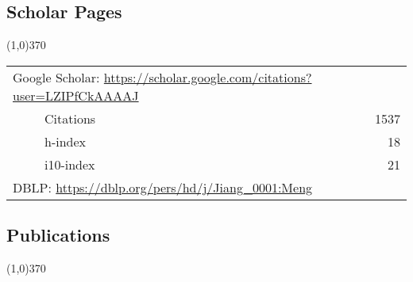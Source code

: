 \documentclass[10pt]{article}
\begin{document}
\vspace{-0.6cm}
\subsection{\sc Scholar Pages}
\vspace{-0.4cm} \line(1,0){370} \vspace{-0.1cm}

\begin{table}[h!]
\begin{tabular*}{12.7cm}{p{11.65cm}r}
\multicolumn{2}{l}{Google Scholar: \url{https://scholar.google.com/citations?user=LZIPfCkAAAAJ}} \\
~~~~~Citations&1537 \\
~~~~~h-index&18 \\
~~~~~i10-index&21 \\
\multicolumn{2}{l}{DBLP: \url{https://dblp.org/pers/hd/j/Jiang\_0001:Meng}} \\
\end{tabular*}
\end{table}

\vspace{-0.6cm}
\subsection{}
\subsection{\sc Publications}
\vspace{-0.4cm} \line(1,0){370} \vspace{-0.1cm}
\end{document}
